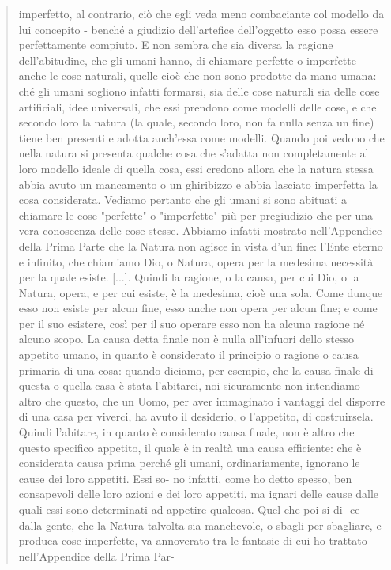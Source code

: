 \begin{quotation}
	imperfetto, al contrario, ciò che egli veda meno combaciante col modello da lui concepito -
	benché a giudizio dell’artefice dell’oggetto esso possa essere perfettamente compiuto. E
	non sembra che sia diversa la ragione dell’abitudine, che gli umani hanno, di chiamare perfette o imperfette anche le cose naturali, quelle cioè che non sono prodotte da mano umana: ché gli umani sogliono infatti formarsi, sia delle cose naturali sia delle cose artificiali,
	idee universali, che essi prendono come modelli delle cose, e che secondo loro la natura (la
	quale, secondo loro, non fa nulla senza un fine) tiene ben presenti e adotta anch’essa come
	modelli. Quando poi vedono che nella natura si presenta qualche cosa che s’adatta non
	completamente al loro modello ideale di quella cosa, essi credono allora che la natura stessa abbia avuto un mancamento o un ghiribizzo e abbia lasciato imperfetta la cosa considerata. Vediamo pertanto che gli umani si sono abituati a chiamare le cose "perfette" o "imperfette" più per pregiudizio che per una vera conoscenza delle cose stesse. Abbiamo infatti
	mostrato nell’Appendice della Prima Parte che la Natura non agisce in vista d’un fine: l’Ente eterno e infinito, che chiamiamo Dio, o Natura, opera per la medesima necessità per la
	quale esiste. [...]. Quindi la ragione, o la causa, per cui Dio, o la Natura,
	opera, e per cui esiste, è la medesima, cioè una sola. Come dunque esso non esiste per alcun fine, esso anche non opera per alcun fine; e come per il suo esistere, così per il suo operare esso non ha alcuna ragione né alcuno scopo. La causa detta finale non è nulla all’infuori dello stesso appetito umano, in quanto è considerato il principio o ragione o causa
	primaria di una cosa: quando diciamo, per esempio, che la causa finale di questa o quella
	casa è stata l’abitarci, noi sicuramente non intendiamo altro che questo, che un Uomo, per aver immaginato i vantaggi del disporre di una casa per viverci, ha avuto il desiderio, o l’appetito, di costruirsela. Quindi l’abitare, in quanto è considerato causa finale, non è altro
	che questo specifico appetito, il quale è in realtà una causa efficiente: che è considerata
	causa prima perché gli umani, ordinariamente, ignorano le cause dei loro appetiti. Essi so-
	no infatti, come ho detto spesso, ben consapevoli delle loro azioni e dei loro appetiti, ma
	ignari delle cause dalle quali essi sono determinati ad appetire qualcosa. Quel che poi si di-
	ce dalla gente, che la Natura talvolta sia manchevole, o sbagli per sbagliare, e produca cose
	imperfette, va annoverato tra le fantasie di cui ho trattato nell’Appendice della Prima Par-

\end{quotation}
